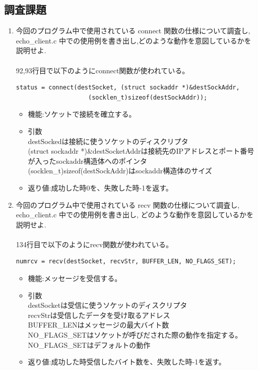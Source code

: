 \documentclass[a4j]{celb-report}
\begin{document}
\subsection{調査課題}
\begin{enumerate}
 \renewcommand{\labelenumi}{(\arabic{enumi})}
 \item 今回のプログラム中で使用されている connect 関数の仕様について調査し, echo\_client.c 中での使用例を書き出し,どのような動作を意図しているかを説明せよ.\\
\\
92,93行目で以下のようにconnect関数が使われている。
  \begin{lstlisting}[basicstyle=\ttfamily\footnotesize, frame=single]
    status = connect(destSocket, (struct sockaddr *)&destSockAddr, 
                    (socklen_t)sizeof(destSockAddr));
  \end{lstlisting}
  \begin{itemize}
   \item 機能:ソケットで接続を確立する。
   \item 引数\\
destSockedは接続に使うソケットのディスクリプタ\\
(struct sockaddr *)\&destSocketAddrは接続先のIPアドレスとポート番号が入ったsockaddr構造体へのポインタ\\
(socklen\_t)sizeof(destSockAddr)はsockaddr構造体のサイズ
   \item 返り値:成功した時0を、失敗した時-1を返す。
  \end{itemize}
 \item 今回のプログラム中で使用されている recv 関数の仕様について調査し, echo\_client.c 中での使用例を書き出し, どのような動作を意図しているかを説明せよ.\\
\\
134行目で以下のようにrecv関数が使われている。
  \begin{lstlisting}[basicstyle=\ttfamily\footnotesize, frame=single]
        numrcv = recv(destSocket, recvStr, BUFFER_LEN, NO_FLAGS_SET);
  \end{lstlisting}
  \begin{itemize}
   \item 機能:メッセージを受信する。
   \item 引数\\
destSocketは受信に使うソケットのディスクリプタ\\
recvStrは受信したデータを受け取るアドレス\\
BUFFER\_LENはメッセージの最大バイト数\\
NO\_FLAGS\_SETはソケットが呼びだされた際の動作を指定する。NO\_FLAGS\_SETはデフォルトの動作
   \item 返り値:成功した時受信したバイト数を、失敗した時-1を返す。
  \end{itemize}
\end{enumerate}
\end{document}
